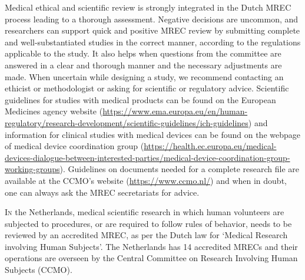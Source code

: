 \documentclass[authordate, empirical]{jote-new-article}
\author[1]{\mbox{Sigrid Heinsbroek\orcid{0000-0003-0971-8599}}}
\affil[1]{METC NedMec}
\author[1]{\mbox{Vincent Bontrop\orcid{0000-0003-4009-0939}}}
\author[1]{\mbox{Rutger P. Chorus}}
\author[1]{\mbox{C. Michel Zwaan\orcid{0000-0001-6892-8268}}}
\begin{document}
\begin{frontmatter}
  \maketitle
  \begin{abstract}
    \printabstracttext
  \end{abstract}
\end{frontmatter}

\begin{takeHomeMessage}
	Medical ethical and scientific review is strongly integrated in the Dutch MREC process leading to a thorough assessment. Negative decisions are uncommon, and researchers can support quick and positive MREC review by submitting complete and well-substantiated studies in the correct manner, according to the regulations applicable to the study. It also helps when questions from the committee are answered in a clear and thorough manner and the necessary adjustments are made. When uncertain while designing a study, we recommend contacting an ethicist or methodologist or asking for scientific or regulatory advice. Scientific guidelines for studies with medical products can be found on the European Medicines agency website (\url{https://www.ema.europa.eu/en/human-regulatory/research-development/scientific-guidelines/ich-guidelines}) and information for clinical studies with medical devices can be found on the webpage of medical device coordination group (\url{https://health.ec.europa.eu/medical-devices-dialogue-between-interested-parties/medical-device-coordination-group-working-groups}). Guidelines on documents needed for a complete research file are available at the CCMO's website (\url{https://www.ccmo.nl/}) and when in doubt, one can always ask the MREC secretariats for advice.
	\end{takeHomeMessage}


	\lettrine{I}{n} the Netherlands, medical scientific research in which human volunteers are subjected to procedures, or are required to follow rules of behavior, needs to be reviewed by an accredited MREC, as per the Dutch law for ‘Medical Research involving Human Subjects'. The Netherlands has 14 accredited MRECs and their operations are overseen by the Central Committee on Research Involving Human Subjects (CCMO).
\end{document}
